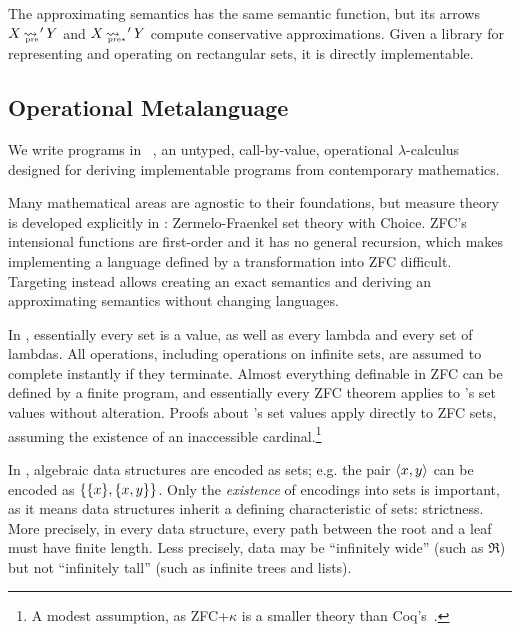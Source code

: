 \documentclass{llncs}
\newcommand{\arrow}{\rightsquigarrow}
\newcommand{\pre}{_\mathrm{pre}}
\DeclareMathOperator{\preto}{\arrow_{\mspace{-19mu}\pre}}
\DeclareMathOperator{\ppreto}{\arrow_{\mspace{-19mu}_{\mathrm{pre*}}}}
\begin{document}
The approximating semantics has the same semantic function, but its arrows $X \preto' Y$ and $X \ppreto' Y$ compute conservative approximations.
Given a library for representing and operating on rectangular sets, it is directly implementable.


\subsection{Operational Metalanguage}

We write programs in \lzfclang~\cite{cit:toronto-2012flops-lzfc}, an untyped, call-by-value, operational $\lambda$-calculus designed for deriving implementable programs from contemporary mathematics.

Many mathematical areas are agnostic to their foundations, but measure theory is developed explicitly in : Zermelo-Fraenkel set theory with Choice.
ZFC's intensional functions are first-order and it has no general recursion, which makes implementing a language defined by a transformation into ZFC difficult.
Targeting \lzfclang instead allows creating an exact semantics and deriving an approximating semantics without changing languages.

In \lzfclang, essentially every set is a value, as well as every lambda and every set of lambdas.
All operations, including operations on infinite sets, are assumed to complete instantly if they terminate.
Almost everything definable in ZFC can be defined by a finite \lzfclang program, and essentially every ZFC theorem applies to \lzfclang's set values without alteration.
Proofs about \lzfclang's set values apply directly to ZFC sets, assuming the existence of an inaccessible cardinal.\footnote{A modest assumption, as ZFC+$\kappa$ is a smaller theory than Coq's~\cite{cit:barras-2010-sets-coq}.}

In \lzfclang, algebraic data structures are encoded as sets; e.g. the pair $\langle{x,y}\rangle$ can be encoded as $\{{\{{x}\},\{{x,y}\}}\}$.
Only the \emph{existence} of encodings into sets is important, as it means data structures inherit a defining characteristic of sets: strictness.
More precisely, in every data structure, every path between the root and a leaf must have finite length.
Less precisely, data may be ``infinitely wide'' (such as $\Re$) but not ``infinitely tall'' (such as infinite trees and lists).
\end{document}
